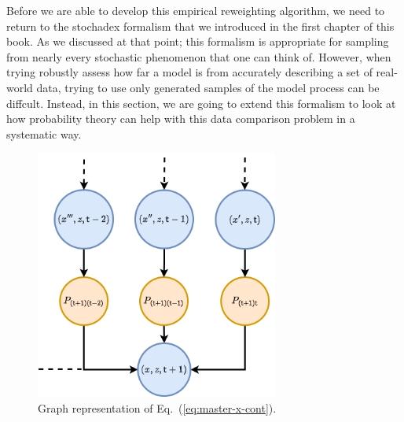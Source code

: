 Before we are able to develop this empirical reweighting algorithm, we need to return to the stochadex formalism that we introduced in the first chapter of this book. As we discussed at that point; this formalism is appropriate for sampling from nearly every stochastic phenomenon that one can think of. However, when trying robustly assess how far a model is from accurately describing a set of real-world data, trying to use only generated samples of the model process can be diffcult. Instead, in this section, we are going to extend this formalism to look at how probability theory can help with this data comparison problem in a systematic way.

\begin{figure}[h]
\centering
\includegraphics[width=8cm]{images/chapter-4-master-eq-graph.drawio.png}
\caption{Graph representation of Eq.~(\ref{eq:master-x-cont}).}
\label{fig:master-eqn}
\end{figure} 

